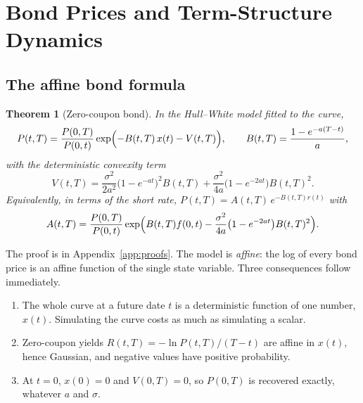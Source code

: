 \documentclass[11pt,a4paper]{article}
\theoremstyle{plain}
\newtheorem{theorem}{Theorem}[section]
\theoremstyle{definition}
\begin{document}
\clearpage
\section{Bond Prices and Term-Structure Dynamics}
\label{sec:bonds}

\subsection{The affine bond formula}
\begin{theorem}[Zero-coupon bond]\label{thm:bond}
In the Hull--White model fitted to the curve,
\begin{equation}
    P(t,T)=\frac{P(0,T)}{P(0,t)}\exp\Bigl(-B(t,T)\,x(t)-V(t,T)\Bigr),
    \qquad
    B(t,T)=\frac{1-e^{-a(T-t)}}{a},
    \label{eq:bond}
\end{equation}
with the deterministic convexity term
\begin{equation}
    V(t,T)=\frac{\sigma^2}{2a^2}\bigl(1-e^{-at}\bigr)^2B(t,T)+\frac{\sigma^2}{4a}\bigl(1-e^{-2at}\bigr)B(t,T)^2.
    \label{eq:V}
\end{equation}
Equivalently, in terms of the short rate, $P(t,T)=A(t,T)\,e^{-B(t,T)r(t)}$ with
\begin{equation}
    A(t,T)=\frac{P(0,T)}{P(0,t)}\exp\Bigl(B(t,T)f(0,t)-\frac{\sigma^2}{4a}\bigl(1-e^{-2at}\bigr)B(t,T)^2\Bigr).
    \label{eq:A}
\end{equation}
\end{theorem}
The proof is in Appendix~\ref{app:proofs}. The model is \emph{affine}: the log of every bond price is an affine function of the single state variable. Three consequences follow immediately.
\begin{enumerate}[label=(\roman*)]
    \item The whole curve at a future date $t$ is a deterministic function of one number, $x(t)$. Simulating the curve costs as much as simulating a scalar.
    \item Zero-coupon yields $R(t,T)=-\ln P(t,T)/(T-t)$ are affine in $x(t)$, hence Gaussian, and negative values have positive probability.
    \item At $t=0$, $x(0)=0$ and $V(0,T)=0$, so $P(0,T)$ is recovered exactly, whatever $a$ and $\sigma$.
\end{enumerate}
\end{document}
